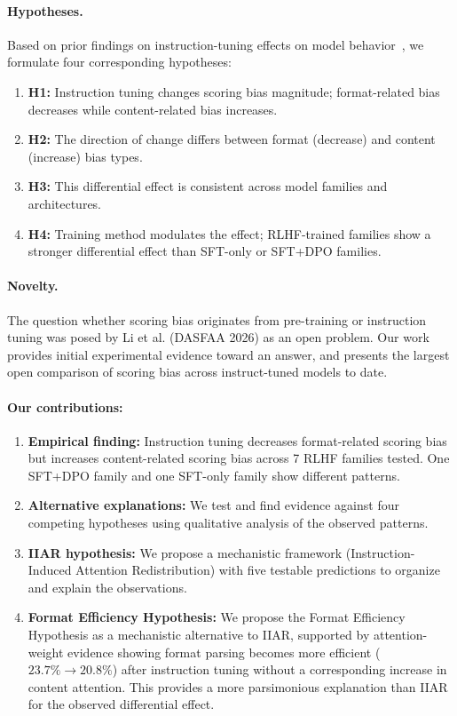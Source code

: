 \documentclass[11pt,twocolumn]{article}
\begin{document}
\paragraph{Hypotheses.} Based on prior findings on instruction-tuning effects on model behavior~\cite{pan2025user,thakur2024judging}, we formulate four corresponding hypotheses:
\begin{enumerate}
    \item \textbf{H1:} Instruction tuning changes scoring bias magnitude; format-related bias decreases while content-related bias increases.
    \item \textbf{H2:} The direction of change differs between format (decrease) and content (increase) bias types.
    \item \textbf{H3:} This differential effect is consistent across model families and architectures.
    \item \textbf{H4:} Training method modulates the effect; RLHF-trained families show a stronger differential effect than SFT-only or SFT+DPO families.
\end{enumerate}

\paragraph{Novelty.} The question  whether scoring bias originates from pre-training or instruction tuning  was posed by Li et al. (DASFAA 2026) as an open problem. Our work provides initial experimental evidence toward an answer, and presents the largest open comparison of scoring bias across instruct-tuned models to date.

\paragraph{Our contributions:}
\begin{enumerate}
    \item \textbf{Empirical finding:} Instruction tuning decreases format-related scoring bias but increases content-related scoring bias across 7 RLHF families tested. One SFT+DPO family and one SFT-only family show different patterns.
    \item \textbf{Alternative explanations:} We test and find evidence against four competing hypotheses using qualitative analysis of the observed patterns.
    \item \textbf{IIAR hypothesis:} We propose a mechanistic framework (Instruction-Induced Attention Redistribution) with five testable predictions to organize and explain the observations.
    \item \textbf{Format Efficiency Hypothesis:} We propose the Format Efficiency Hypothesis as a mechanistic alternative to IIAR, supported by attention-weight evidence showing format parsing becomes more efficient ($23.7\% \to 20.8\%$) after instruction tuning without a corresponding increase in content attention. This provides a more parsimonious explanation than IIAR for the observed differential effect.
\end{enumerate}
\end{document}
